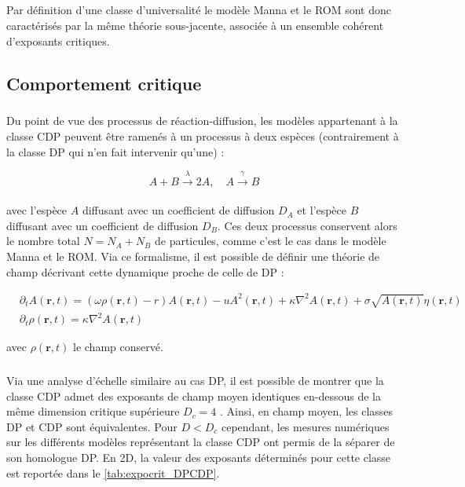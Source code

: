\subparagraph{}Par définition d'une classe d'universalité le modèle Manna et le ROM sont donc caractérisés par la même théorie sous-jacente, associée à un ensemble cohérent d'exposants critiques.

\subsection{Comportement critique}

\label{sec:CompCDP}

\subparagraph{}Du point de vue des processus de réaction-diffusion, les modèles appartenant à la classe CDP peuvent être ramenés à un processus à deux espèces \cite{van_wijland_wilson_1998, pastor_satorras_reaction_diffusion_2001, pastor_satorras_field_2000} (contrairement à la classe DP qui n'en fait intervenir qu'une) :

\begin{equation}
	A +B \xrightarrow[]{\lambda} 2A, \quad A \xrightarrow[]{\gamma} B
\end{equation}

\noindent avec l'espèce $A$ diffusant avec un coefficient de diffusion $D_A$ et l'espèce $B$ diffusant avec un coefficient de diffusion $D_B$. Ces deux processus conservent alors le nombre total $N=N_A+N_B$ de particules, comme c'est le cas dans le modèle Manna et le ROM. Via ce formalisme, il est possible de définir une théorie de champ décrivant cette dynamique proche de celle de DP \cite{van_wijland_universality_2002, le_doussal_exact_2015} :

\begin{equation}
\begin{aligned}
	&\partial_t A(\mathbf{r}, t) = (\omega\rho (\mathbf{r}, t) - r)A(\mathbf{r}, t) - uA^2(\mathbf{r}, t) + \kappa\nabla^2 A (\mathbf{r}, t) + \sigma \sqrt{A(\mathbf{r}, t)} \eta(\mathbf{r}, t)\\
	&\partial_t \rho (\mathbf{r}, t) = \kappa\nabla^2 A (\mathbf{r}, t)
\end{aligned}
\label{eq:CDP}
\end{equation}

\noindent avec $\rho(\mathbf{r}, t)$ le champ conservé.

\subparagraph{}Via une analyse d'échelle similaire au cas DP, il est possible de montrer que la classe CDP admet des exposants de champ moyen identiques en-dessous de la même dimension critique supérieure $D_c = 4$ \cite{le_doussal_exact_2015, lubeck_universal_2004}. Ainsi, en champ moyen, les classes DP et CDP sont équivalentes. Pour $D<D_c$ cependant, les mesures numériques sur les différents modèles représentant la classe CDP ont permis de la séparer de son homologue DP. En 2D, la valeur des exposants déterminés pour cette classe est reportée dans le \autoref{tab:expocrit_DPCDP}.

